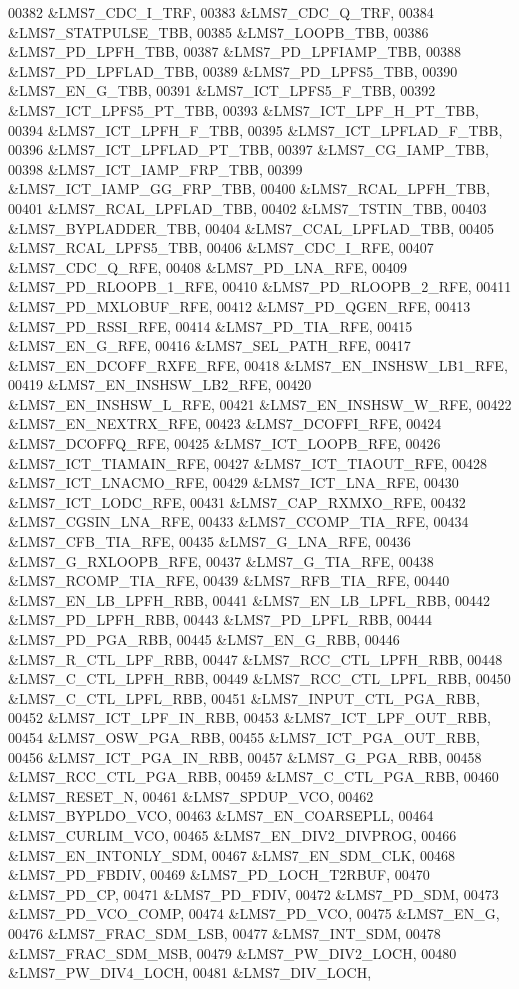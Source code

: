 \begin{DoxyCode}
00382 &LMS7_CDC_I_TRF,
00383 &LMS7_CDC_Q_TRF,
00384 &LMS7_STATPULSE_TBB,
00385 &LMS7_LOOPB_TBB,
00386 &LMS7_PD_LPFH_TBB,
00387 &LMS7_PD_LPFIAMP_TBB,
00388 &LMS7_PD_LPFLAD_TBB,
00389 &LMS7_PD_LPFS5_TBB,
00390 &LMS7_EN_G_TBB,
00391 &LMS7_ICT_LPFS5_F_TBB,
00392 &LMS7_ICT_LPFS5_PT_TBB,
00393 &LMS7_ICT_LPF_H_PT_TBB,
00394 &LMS7_ICT_LPFH_F_TBB,
00395 &LMS7_ICT_LPFLAD_F_TBB,
00396 &LMS7_ICT_LPFLAD_PT_TBB,
00397 &LMS7_CG_IAMP_TBB,
00398 &LMS7_ICT_IAMP_FRP_TBB,
00399 &LMS7_ICT_IAMP_GG_FRP_TBB,
00400 &LMS7_RCAL_LPFH_TBB,
00401 &LMS7_RCAL_LPFLAD_TBB,
00402 &LMS7_TSTIN_TBB,
00403 &LMS7_BYPLADDER_TBB,
00404 &LMS7_CCAL_LPFLAD_TBB,
00405 &LMS7_RCAL_LPFS5_TBB,
00406 &LMS7_CDC_I_RFE,
00407 &LMS7_CDC_Q_RFE,
00408 &LMS7_PD_LNA_RFE,
00409 &LMS7_PD_RLOOPB_1_RFE,
00410 &LMS7_PD_RLOOPB_2_RFE,
00411 &LMS7_PD_MXLOBUF_RFE,
00412 &LMS7_PD_QGEN_RFE,
00413 &LMS7_PD_RSSI_RFE,
00414 &LMS7_PD_TIA_RFE,
00415 &LMS7_EN_G_RFE,
00416 &LMS7_SEL_PATH_RFE,
00417 &LMS7_EN_DCOFF_RXFE_RFE,
00418 &LMS7_EN_INSHSW_LB1_RFE,
00419 &LMS7_EN_INSHSW_LB2_RFE,
00420 &LMS7_EN_INSHSW_L_RFE,
00421 &LMS7_EN_INSHSW_W_RFE,
00422 &LMS7_EN_NEXTRX_RFE,
00423 &LMS7_DCOFFI_RFE,
00424 &LMS7_DCOFFQ_RFE,
00425 &LMS7_ICT_LOOPB_RFE,
00426 &LMS7_ICT_TIAMAIN_RFE,
00427 &LMS7_ICT_TIAOUT_RFE,
00428 &LMS7_ICT_LNACMO_RFE,
00429 &LMS7_ICT_LNA_RFE,
00430 &LMS7_ICT_LODC_RFE,
00431 &LMS7_CAP_RXMXO_RFE,
00432 &LMS7_CGSIN_LNA_RFE,
00433 &LMS7_CCOMP_TIA_RFE,
00434 &LMS7_CFB_TIA_RFE,
00435 &LMS7_G_LNA_RFE,
00436 &LMS7_G_RXLOOPB_RFE,
00437 &LMS7_G_TIA_RFE,
00438 &LMS7_RCOMP_TIA_RFE,
00439 &LMS7_RFB_TIA_RFE,
00440 &LMS7_EN_LB_LPFH_RBB,
00441 &LMS7_EN_LB_LPFL_RBB,
00442 &LMS7_PD_LPFH_RBB,
00443 &LMS7_PD_LPFL_RBB,
00444 &LMS7_PD_PGA_RBB,
00445 &LMS7_EN_G_RBB,
00446 &LMS7_R_CTL_LPF_RBB,
00447 &LMS7_RCC_CTL_LPFH_RBB,
00448 &LMS7_C_CTL_LPFH_RBB,
00449 &LMS7_RCC_CTL_LPFL_RBB,
00450 &LMS7_C_CTL_LPFL_RBB,
00451 &LMS7_INPUT_CTL_PGA_RBB,
00452 &LMS7_ICT_LPF_IN_RBB,
00453 &LMS7_ICT_LPF_OUT_RBB,
00454 &LMS7_OSW_PGA_RBB,
00455 &LMS7_ICT_PGA_OUT_RBB,
00456 &LMS7_ICT_PGA_IN_RBB,
00457 &LMS7_G_PGA_RBB,
00458 &LMS7_RCC_CTL_PGA_RBB,
00459 &LMS7_C_CTL_PGA_RBB,
00460 &LMS7_RESET_N,
00461 &LMS7_SPDUP_VCO,
00462 &LMS7_BYPLDO_VCO,
00463 &LMS7_EN_COARSEPLL,
00464 &LMS7_CURLIM_VCO,
00465 &LMS7_EN_DIV2_DIVPROG,
00466 &LMS7_EN_INTONLY_SDM,
00467 &LMS7_EN_SDM_CLK,
00468 &LMS7_PD_FBDIV,
00469 &LMS7_PD_LOCH_T2RBUF,
00470 &LMS7_PD_CP,
00471 &LMS7_PD_FDIV,
00472 &LMS7_PD_SDM,
00473 &LMS7_PD_VCO_COMP,
00474 &LMS7_PD_VCO,
00475 &LMS7_EN_G,
00476 &LMS7_FRAC_SDM_LSB,
00477 &LMS7_INT_SDM,
00478 &LMS7_FRAC_SDM_MSB,
00479 &LMS7_PW_DIV2_LOCH,
00480 &LMS7_PW_DIV4_LOCH,
00481 &LMS7_DIV_LOCH,

\end{DoxyCode}
